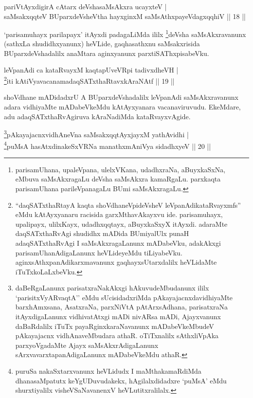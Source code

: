 
\begin{shl}
pariVtAyxdigirA cAtarx deVshasaMsAkxra ucayxteV | \\
saMsakxqqteV BUparxdeVsheV\s tha hayxginxM saMsAthxpayeVdagxqqhiV \hfill|| 18 || 
\end{shl}

\begin{artha}
`parisamuhayx parilapayx' itAyxdi padagaLiMda ililx \footnote{parisamUhana, upaleVpana, ulelxVKana, udadhxraNa, aBuyxkaSxNa, eMbuva saMsAkxragaLu deVsha saMsAkxra kamaRgaLu. parxkaqta parisamUhana parileVpanagaLu BUmi saMsAkxragaLu.}deVsha saMsAkxravanunx (sathxLa shudidhxyanunx) heVLide, gaqhasathxnu saMsakxrisida BUparxdeVshadalilx anaMtara aginxyanunx parxtiSAThxpisabeVku.
\end{artha}

\begin{shl}
leVpanAdi ca kataRvayxM kaqtapUveVR\s pi tadivxdheVH | \\
\footnote{``daqSATxthaRtayA kaqta shoVdhaneV\s pideVsheV leVpanAdikataRvayxmfs'' eMdu kAtAyxyanaru racisida garxMthavAkayxvu ide. parisamuhayx, upalipayx, ulilxKayx, udadhxqqtayx, aBuyxkaSxyX itAyxdi. adaraMte daqSATxthaRvAgi shudidhx mADida BUmiyalUlx punaH adaqSATxthaRvAgi I saMsAkxragaLanunx mADabeVku, adakAkxgi parisamUhanAdigaLanunx heVLideyeMdu tiLiyabeVku. aginxsAthxpanAdikarxmavanunx gaqhayxsUtarxdalilx heVLidaMte iTuTxkoLaLxbeVku.}iti kAtiVyavacanamadaqSATxthaRtavxkAraNAtf \hfill|| 19 || 
\end{shl}

\begin{artha}
shoVdhane mADidadxrU A BUparxdeVshadalilx leVpanAdi saMsAkxravanunx adara vidhiyaMte mADabeVkeMdu kAtAyxyanara vacanaviruvudu. EkeMdare, adu adaqSATxthaRvAgiruva kAraNadiMda kataRvayxvAgide.
\end{artha}


\begin{shl}
\footnote{daBeRgaLanunx parisatxraNakAkxgi hAkuvudeMbudanunx ililx `parisitxVyARvaqtA'' eMdu sUcisidadxriMda pAkayajacnxdavidhiyaMte barxhAmxsana, AsatxraNa, parxNiVtA pAtArxsAdhana, parisatxraNa itAyxdigaLanunx vidhivatAtxgi mADi nivARsa mADi, Ajayxvanunx daBaRdalilx iTuTx payaRginxkaraNavanunx mADabeVkeMbudeV pAkayajacnx vidhAnaveMbudara athaR. oTiTxnalilx sAthxliVpAka parxyoVgadaMte Ajayx saMsAkxrAdigaLanunx sArxvavarxtapanAdigaLanunx mADabeVkeMdu athaR.}pAkayajacnxvidhAneVna saMsakxqqtAyx\s \s jayxM yathAvidhi | \\
\footnote{puruSa nakaSxtarxvanunx heVLidudx I maMthakamaRdiMda dhanasaMpatutx keYgUDuvudakekx, hAgilalxdidadxre `puMsA' eMdu shurxtiyalilx visheVSaNavanenxV heVLutitxralilalx.}puMsA hasAtxdinakeSxVRNa manathxmAniVya sidadhxyeV \hfill|| 20 || 
\end{shl}



